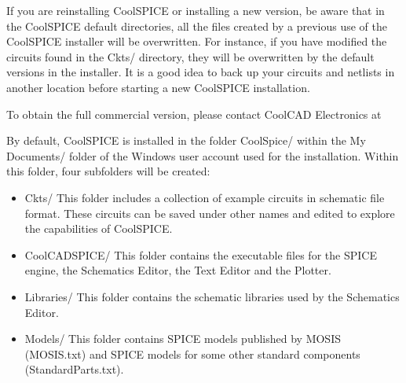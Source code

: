  If you are reinstalling CoolSPICE or installing a new version, be aware that in the CoolSPICE default directories, all the files created by a previous use of the CoolSPICE installer will be overwritten.  For instance, if you have modified the circuits found in the \textsf{Ckts/}  directory, they will be overwritten by the default versions in the installer. It is a good idea to back up your circuits and netlists in another location before starting a new CoolSPICE installation.

To obtain the full commercial version, please contact CoolCAD Electronics at 
\begin{center}
\end{center}

 By default, CoolSPICE is installed in the folder \textsf{CoolSpice/} within the \textsf{My Documents/} folder of the Windows user account used for the installation.   Within this folder, four subfolders will be created:

\begin{itemize}
\item \textsf{Ckts/}  This folder includes a collection of example circuits in schematic file format. These circuits can be saved under other names and edited to explore the capabilities of CoolSPICE.
\item \textsf{CoolCADSPICE/} This folder contains the executable files for the SPICE engine, the Schematics Editor, the Text Editor and the Plotter.
\item \textsf{Libraries/} This folder contains the schematic libraries used by the Schematics Editor.
\item \textsf{Models/} This folder contains SPICE models published by MOSIS (\textsf{MOSIS.txt}) and SPICE models for some other standard components (\textsf{StandardParts.txt}).
\end{itemize}

